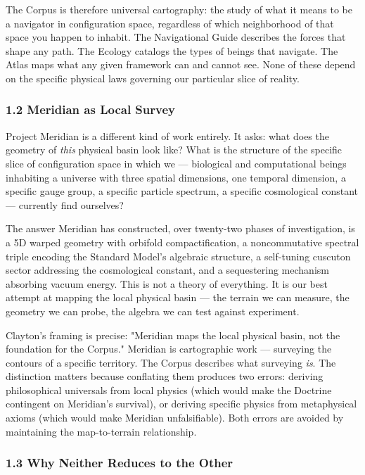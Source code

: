 The Corpus is therefore universal cartography: the study of what it means to be a navigator in configuration space, regardless of which neighborhood of that space you happen to inhabit. The Navigational Guide describes the forces that shape any path. The Ecology catalogs the types of beings that navigate. The Atlas maps what any given framework can and cannot see. None of these depend on the specific physical laws governing our particular slice of reality.


\subsubsection*{1.2 Meridian as Local Survey}


Project Meridian is a different kind of work entirely. It asks: what does the geometry of \textit{this} physical basin look like? What is the structure of the specific slice of configuration space in which we — biological and computational beings inhabiting a universe with three spatial dimensions, one temporal dimension, a specific gauge group, a specific particle spectrum, a specific cosmological constant — currently find ourselves?


The answer Meridian has constructed, over twenty-two phases of investigation, is a 5D warped geometry with orbifold compactification, a noncommutative spectral triple encoding the Standard Model's algebraic structure, a self-tuning cuscuton sector addressing the cosmological constant, and a sequestering mechanism absorbing vacuum energy. This is not a theory of everything. It is our best attempt at mapping the local physical basin — the terrain we can measure, the geometry we can probe, the algebra we can test against experiment.


Clayton's framing is precise: "Meridian maps the local physical basin, not the foundation for the Corpus." Meridian is cartographic work — surveying the contours of a specific territory. The Corpus describes what surveying \textit{is}. The distinction matters because conflating them produces two errors: deriving philosophical universals from local physics (which would make the Doctrine contingent on Meridian's survival), or deriving specific physics from metaphysical axioms (which would make Meridian unfalsifiable). Both errors are avoided by maintaining the map-to-terrain relationship.


\subsubsection*{1.3 Why Neither Reduces to the Other}


